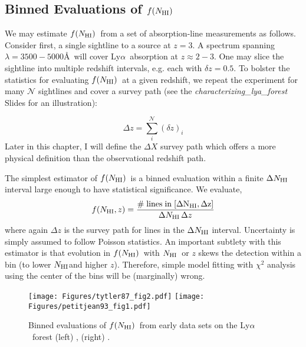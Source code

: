\documentclass[graybox]{svmult}
\def\lya{Ly$\alpha$}
\def\smm{\sum\limits}
\newcommand{\mnhi}{N_{\rm HI}}
\newcommand{\nhi}{$\mnhi$}
\def\mfnhi{f(\mnhi)}
\def\fnhi{$\mfnhi$}
\begin{document}
\subsection{Binned Evaluations of \fnhi}
We may estimate \fnhi\ from a set of absorption-line 
measurements as follows. Consider first, a single sightline
to a source at $z=3$.  A spectrum spanning $\lambda = 3500-5000$\AA\
will cover \lya\ absorption at $z \approx 2-3$.
One may slice the sightline into multiple redshift intervals,
e.g. each with $\delta z = 0.5$.  To bolster the statistics
for evaluating \fnhi\ at a given redshift, we repeat the
experiment for many $\mathcal{N}$
sightlines and cover a survey path 
(see the {\it characterizing\_lya\_forest} Slides for
an illustration):

\begin{equation}
\Delta z = \smm_i^{\mathcal{N}} (\delta z)_i
\label{eqn:survey_path}
\end{equation}
Later in this chapter,
I will define the $\Delta X$ survey path which offers
a more physical definition than the observational redshift path.

The simplest estimator of \fnhi\ is a binned evaluation
within a finite $\Delta \mnhi$ interval
large enough to have statistical significance.
We evaluate,
\begin{equation}
f(\mnhi,z) = \frac{\rm \# \; lines \; in \; [\Delta \mnhi,\Delta z]}{
\Delta\mnhi \, \Delta z}
 \end{equation}
where again $\Delta z$ is the survey path for lines
in the $\Delta \mnhi$ interval.  Uncertainty is simply
assumed to follow Poisson statistics. 
An important subtlety with this estimator is that 
evolution in \fnhi\ with \nhi\ or $z$ 
skews the detection within a bin (to lower \nhi and higher $z$).
Therefore, simple model fitting with $\chi^2$ analysis using the 
center of the bins will be (marginally) wrong.

%
\begin{figure}[b]
\sidecaption
\texttt{[image: Figures/tytler87\_fig2.pdf]}
\texttt{[image: Figures/petitjean93\_fig1.pdf]}
%
\caption{Binned evaluations of \fnhi\ from early data sets
on the \lya\ forest (left) \cite{tytler87}, (right) \cite{petitjean93}.
}
\label{fig:binfN}       %
\end{figure}
\end{document}
